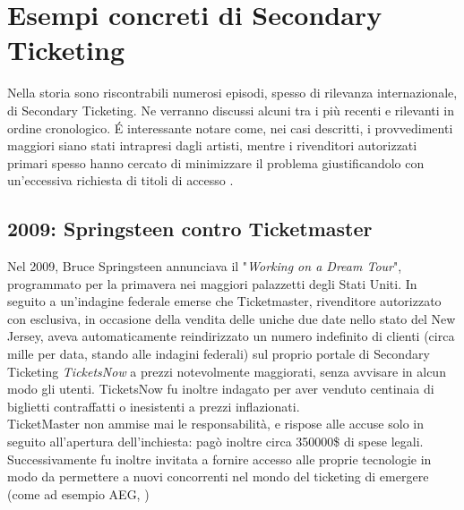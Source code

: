 \section{Esempi concreti di Secondary Ticketing}
Nella storia sono riscontrabili numerosi episodi, spesso di rilevanza internazionale, di Secondary Ticketing. Ne verranno discussi alcuni tra i più recenti e rilevanti in ordine cronologico.
\'E interessante notare come, nei casi descritti, i provvedimenti maggiori siano stati intrapresi dagli artisti, mentre i rivenditori autorizzati primari spesso hanno cercato di minimizzare il problema giustificandolo con un'eccessiva richiesta di titoli di accesso \cite{fortunato2011dancing}.
 
\subsection{2009: Springsteen contro Ticketmaster}
Nel 2009, Bruce Springsteen annunciava il "\textit{Working on a Dream Tour}", programmato per la primavera nei maggiori palazzetti degli Stati Uniti. In seguito a un'indagine federale emerse che Ticketmaster, rivenditore autorizzato con esclusiva, in occasione della vendita delle uniche due date nello stato del New Jersey, aveva automaticamente reindirizzato un numero indefinito di clienti (circa mille per data, stando alle indagini federali) sul proprio portale di Secondary Ticketing \textit{TicketsNow} a prezzi notevolmente maggiorati, senza avvisare in alcun modo gli utenti. TicketsNow fu inoltre indagato per aver venduto centinaia di biglietti contraffatti o inesistenti a prezzi inflazionati. \\
TicketMaster non ammise mai le responsabilità, e rispose alle accuse solo in seguito all'apertura dell'inchiesta: pagò inoltre circa 350000\$ di spese legali. Successivamente fu inoltre invitata a fornire accesso alle proprie tecnologie in modo da permettere a nuovi concorrenti nel mondo del ticketing di emergere (come ad esempio AEG, \cite{fortunato2011dancing})

